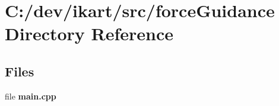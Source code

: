 \section{C\+:/dev/ikart/src/force\+Guidance Directory Reference}
\label{dir_0b8668989739bf2a3264b87dfe58852e}
\subsection*{Files}
\begin{DoxyCompactItemize}
\item 
file {\bfseries main.\+cpp}
\end{DoxyCompactItemize}
